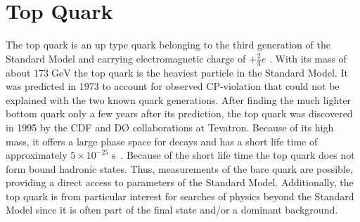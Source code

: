 		
\section{Top Quark}
	The top quark is an up type quark belonging to the third generation of the Standard Model and carrying electromagnetic charge of $+\frac{2}{3}e$ \cite{pdg2016}. With its mass of about $173\;\text{GeV}$ the top quark is the heaviest particle in the Standard Model. It was predicted in 1973 \cite{topPredict} to account for observed CP-violation that could not be explained with the two known quark generations. After finding the much lighter bottom quark only a few years after its prediction, the top quark was discovered in 1995 by the CDF \cite{topCDF} and D\O{} \cite{topD0} collaborations at Tevatron. Because of its high mass, it offers a large phase space for decays and has a short life time of approximately $5 \times 10^{-25}\;\text{s}$~\cite{pdg2016}. Because of the short life time the top quark does not form bound hadronic states. Thus, measurements of the bare quark are possible, providing a direct access to parameters of the Standard Model. Additionally, the top quark is from particular interest for searches of physics beyond the Standard Model since it is often part of the final state and/or a dominant background. 
	
